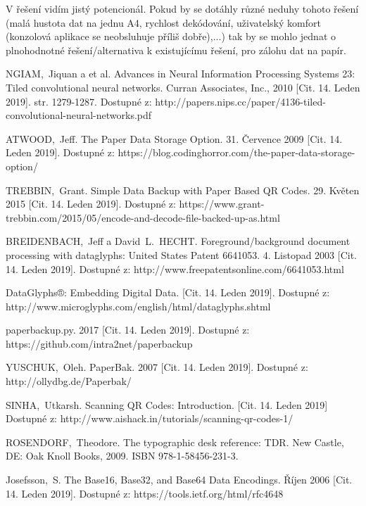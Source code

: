 \documentclass[conference]{IEEEtran}
\begin{document}
V řešení vidím jistý potencionál. Pokud by se dotáhly různé neduhy tohoto řešení (malá hustota dat na jednu A4, rychlost dekódování, uživatelský komfort (konzolová aplikace se neobsluhuje příliš dobře),...) tak by se mohlo jednat o plnohodnotné řešení/alternativa k existujícímu řešení, pro zálohu dat na papír.

\begin{thebibliography}{1}
	
NGIAM,~Jiquan a et al. Advances in Neural Information Processing Systems 23: Tiled convolutional neural networks. Curran Associates, Inc., 2010 [Cit. 14. Leden 2019]. str. 1279-1287. Dostupné z: http://papers.nips.cc/paper/4136-tiled-convolutional-neural-networks.pdf 

ATWOOD,~Jeff. The Paper Data Storage Option. 31. Července 2009 [Cit. 14. Leden 2019]. Dostupné z: https://blog.codinghorror.com/the-paper-data-storage-option/

TREBBIN,~Grant. Simple Data Backup with Paper Based QR Codes. 29. Květen 2015 [Cit. 14. Leden 2019]. Dostupné z: https://www.grant-trebbin.com/2015/05/encode-and-decode-file-backed-up-as.html  
	
BREIDENBACH,~Jeff a David~L.~HECHT. Foreground/background document processing with dataglyphs: United States Patent 6641053. 4. Listopad 2003 [Cit. 14. Leden 2019]. Dostupné z: http://www.freepatentsonline.com/6641053.html

DataGlyphs®: Embedding Digital Data. [Cit. 14. Leden 2019]. Dostupné z: http://www.microglyphs.com/english/html/dataglyphs.shtml
	
paperbackup.py. 2017 [Cit. 14. Leden 2019]. Dostupné z: https://github.com/intra2net/paperbackup
  
YUSCHUK,~Oleh. PaperBak. 2007 [Cit. 14. Leden 2019]. Dostupné z: http://ollydbg.de/Paperbak/

SINHA,~Utkarsh. Scanning QR Codes: Introduction. [Cit. 14. Leden 2019] Dostupné z: http://www.aishack.in/tutorials/scanning-qr-codes-1/
  
ROSENDORF,~Theodore. The typographic desk reference: TDR. New Castle, DE: Oak Knoll Books, 2009. ISBN 978-1-58456-231-3.

Josefsson,~S. The Base16, Base32, and Base64 Data Encodings. Říjen 2006 [Cit. 14. Leden 2019]. Dostupné z: https://tools.ietf.org/html/rfc4648


\end{thebibliography}
\end{document}
